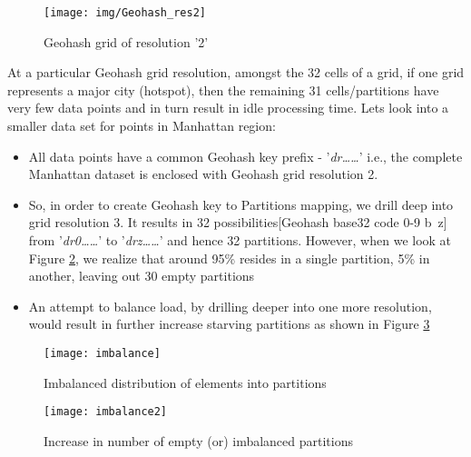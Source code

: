 \documentclass[article,type=msc,colorback,12pt,accentcolor=tud1d]{tudthesis}
\begin{document}
			\begin{figure}[h]
				\centering
				\texttt{[image: img/Geohash\_res2]}
				\caption{Geohash grid of resolution '2'}
				\label{fig:Geohash_res2}
			\end{figure}
		
		
		At a particular Geohash grid resolution, amongst the 32 cells of a grid, if one grid represents a major city (hotspot), then the remaining 31 cells/partitions have very few data points and in turn result in idle processing time. Lets look into a smaller data set for points in Manhattan region:
		
		\begin{itemize}
			\item All data points have a common Geohash key prefix - '\textit{dr\dots\dots}' i.e., the complete Manhattan dataset is enclosed with Geohash grid resolution 2.
			
			\item So, in order to create Geohash key to Partitions mapping, we drill deep into grid resolution 3. It results in 32 possibilities[Geohash base32 code 0-9 b~z] from '\textit{dr0\dots\dots}' to '\textit{drz\dots\dots}' and hence 32 partitions. However, when we look at Figure \ref{fig:imbalance}, we realize that around 95\% resides in a single partition, 5\% in another, leaving out 30 empty partitions
				
			\item An attempt to balance load, by drilling deeper into one more resolution, would result in further increase starving partitions as shown in Figure \ref{fig:imbalance2}
		\end{itemize}
							
				\begin{figure}[hp]
					\centering
					\texttt{[image: imbalance]}
					\caption{Imbalanced distribution of elements into partitions}
					\label{fig:imbalance}
				\end{figure}		
				

				
				\begin{figure}[hp]
					\centering
					\texttt{[image: imbalance2]}
					\caption{Increase in number of empty (or) imbalanced partitions}
					\label{fig:imbalance2}
				\end{figure}
			
			\clearpage
		
\end{document}
